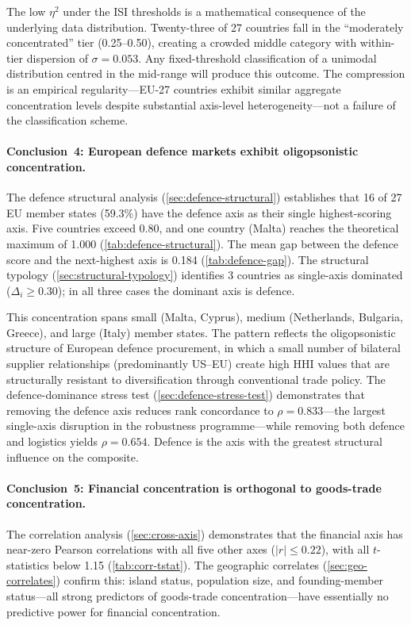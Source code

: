 The low $\eta^2$ under the ISI thresholds is a mathematical
consequence of the underlying data distribution.  Twenty-three of 27
countries fall in the ``moderately concentrated'' tier (0.25--0.50),
creating a crowded middle category with within-tier dispersion of
$\sigma = 0.053$.  Any fixed-threshold classification of a unimodal
distribution centred in the mid-range will produce this outcome.
The compression is an empirical regularity---EU-27 countries exhibit
similar aggregate concentration levels despite substantial axis-level
heterogeneity---not a failure of the classification scheme.

\paragraph{Conclusion~4: European defence markets exhibit
oligopsonistic concentration.}
The defence structural analysis (\cref{sec:defence-structural})
establishes that 16 of 27 EU member states (59.3\%) have the defence
axis as their single highest-scoring axis.  Five countries exceed
0.80, and one country (Malta) reaches the theoretical maximum of
1.000 (\cref{tab:defence-structural}).  The mean gap between the
defence score and the next-highest axis is 0.184
(\cref{tab:defence-gap}).  The structural typology
(\cref{sec:structural-typology}) identifies 3 countries as
single-axis dominated ($\Delta_i \geq 0.30$); in all three cases
the dominant axis is defence.

This concentration spans small (Malta, Cyprus), medium (Netherlands,
Bulgaria, Greece), and large (Italy) member states.  The pattern reflects
the oligopsonistic structure of European defence
procurement, in which a small number of bilateral supplier
relationships (predominantly US--EU) create high HHI values that are
structurally resistant to diversification through conventional trade
policy.  The defence-dominance stress test
(\cref{sec:defence-stress-test}) demonstrates that removing the
defence axis reduces rank concordance to $\rho = 0.833$---the
largest single-axis disruption in the robustness programme---while
removing both defence and logistics yields $\rho = 0.654$.  Defence
is the axis with the greatest structural influence on the composite.

\paragraph{Conclusion~5: Financial concentration is orthogonal to
goods-trade concentration.}
The correlation analysis (\cref{sec:cross-axis}) demonstrates that
the financial axis has near-zero Pearson correlations with all five
other axes ($|r| \leq 0.22$), with all $t$-statistics below 1.15
(\cref{tab:corr-tstat}).  The geographic correlates
(\cref{sec:geo-correlates}) confirm this: island status, population
size, and founding-member status---all strong predictors of
goods-trade concentration---have essentially no predictive power
for financial concentration.


